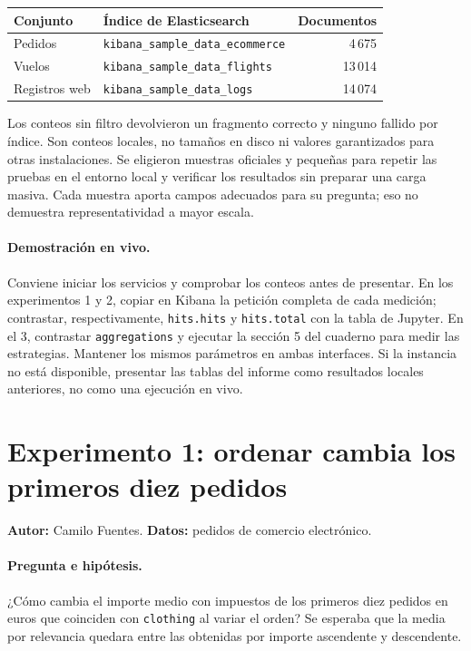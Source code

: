 \documentclass[11pt,a4paper]{article}
\newcommand{\codigo}[1]{\texttt{#1}}
\begin{document}
\begin{center}
\begin{tabular}{llr}
\toprule
Conjunto & Índice de Elasticsearch & Documentos\\
\midrule
Pedidos & \codigo{kibana\_sample\_data\_ecommerce} & 4\,675\\
Vuelos & \codigo{kibana\_sample\_data\_flights} & 13\,014\\
Registros web & \codigo{kibana\_sample\_data\_logs} & 14\,074\\
\bottomrule
\end{tabular}
\end{center}
Los conteos sin filtro devolvieron un fragmento correcto y ninguno fallido
por índice. Son conteos locales, no tamaños en disco ni valores garantizados
para otras instalaciones. Se eligieron muestras oficiales y pequeñas para
repetir las pruebas en el entorno local y verificar los resultados sin
preparar una carga masiva. Cada muestra aporta campos adecuados para su
pregunta; eso no demuestra representatividad a mayor escala.

\paragraph{Demostración en vivo.}
Conviene iniciar los servicios y comprobar los conteos antes de presentar.
En los experimentos 1 y 2, copiar en Kibana la petición completa de cada
medición; contrastar, respectivamente, \codigo{hits.hits} y
\codigo{hits.total} con la tabla de Jupyter. En el 3, contrastar
\codigo{aggregations} y ejecutar la sección 5 del cuaderno para medir las
estrategias. Mantener los mismos parámetros en ambas interfaces. Si la
instancia no está disponible, presentar las tablas del informe como
resultados locales anteriores, no como una ejecución en vivo.

\section{Experimento 1: ordenar cambia los primeros diez pedidos}
\textbf{Autor:} Camilo Fuentes. \textbf{Datos:} pedidos de comercio electrónico.

\paragraph{Pregunta e hipótesis.}
¿Cómo cambia el importe medio con impuestos de los primeros diez pedidos en
euros que coinciden con \codigo{clothing} al variar el orden? Se esperaba que
la media por relevancia quedara entre las obtenidas por importe ascendente
y descendente.
\end{document}
